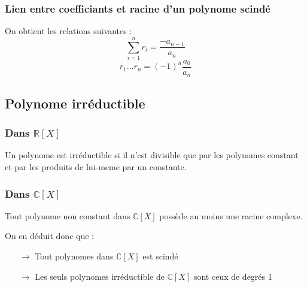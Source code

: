 \subsubsection{Lien entre coefficiants et racine d'un polynome scindé}
On obtient les relations suivantes :
$$\sum_{i=1}^n r_i = \dfrac{-a_{n-1}}{a_n}$$
$$r_1...r_n = (-1)^n\dfrac{a_0}{a_n}$$
\subsection{Polynome irréductible}
\subsubsection{Dans $\mathbb{R}[X]$}
\begin{de}
Un polynome est irréductible si il n'est divisible que par les polynomes constant et par les produits de lui-meme par un constante.
\end{de}
\subsubsection{Dans $\mathbb{C}[X]$}
\begin{theo}
 Tout polynome non constant dans $\mathbb{C}[X]$ possède au moins une racine complexe.
\end{theo}
On en déduit donc que :
\begin{itemize}
 \item[$\rightarrow$] Tout polynomes dans $\mathbb{C}[X]$ est scindé
 \item[$\rightarrow$] Les seuls polynomes irréductible de $\mathbb{C}[X]$ sont ceux de degrés 1
\end{itemize}

